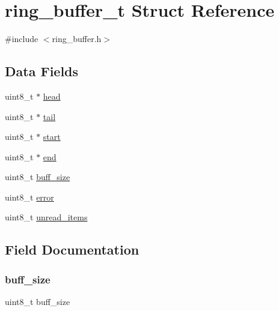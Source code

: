 \hypertarget{structring__buffer__t}{}\section{ring\+\_\+buffer\+\_\+t Struct Reference}
\label{structring__buffer__t}


{\ttfamily \#include $<$ring\+\_\+buffer.\+h$>$}

\subsection*{Data Fields}
\begin{DoxyCompactItemize}
\item 
uint8\+\_\+t $\ast$ \hyperlink{structring__buffer__t_a102cac6eb6f8f341f1891c0905181491}{head}
\item 
uint8\+\_\+t $\ast$ \hyperlink{structring__buffer__t_af7a2fe8e3fd152742f9d54354ad99db7}{tail}
\item 
uint8\+\_\+t $\ast$ \hyperlink{structring__buffer__t_a7b78fc8dde7c5c2b76176106e087b1de}{start}
\item 
uint8\+\_\+t $\ast$ \hyperlink{structring__buffer__t_abd1acb187be8f3b30a79336d4962993f}{end}
\item 
uint8\+\_\+t \hyperlink{structring__buffer__t_afd186f1012b3e5a3eca43a965bfa5adb}{buff\+\_\+size}
\item 
uint8\+\_\+t \hyperlink{structring__buffer__t_adc64ccb7538429fe78e3fe0139267370}{error}
\item 
uint8\+\_\+t \hyperlink{structring__buffer__t_a0ed89f14dd3a8e0a46a901d73c869804}{unread\+\_\+items}
\end{DoxyCompactItemize}


\subsection{Field Documentation}
\hypertarget{structring__buffer__t_afd186f1012b3e5a3eca43a965bfa5adb}{}\label{structring__buffer__t_afd186f1012b3e5a3eca43a965bfa5adb} 
\subsubsection{\texorpdfstring{buff\+\_\+size}{buff\_size}}
{\footnotesize\ttfamily uint8\+\_\+t buff\+\_\+size}

